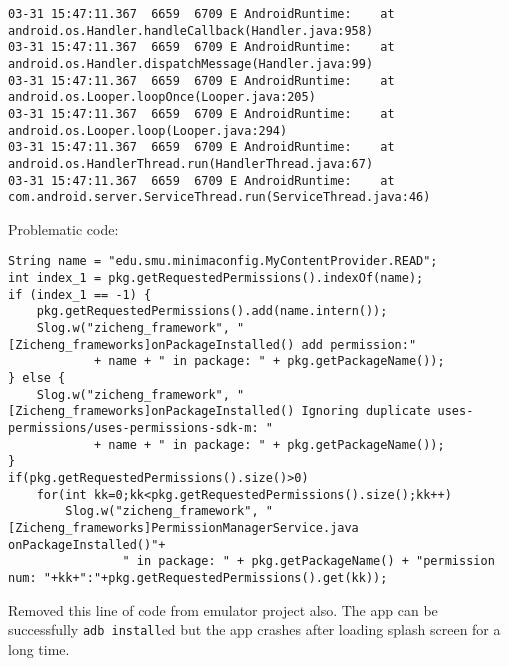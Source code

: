 \begin{lstlisting}
03-31 15:47:11.367  6659  6709 E AndroidRuntime: 	at android.os.Handler.handleCallback(Handler.java:958)
03-31 15:47:11.367  6659  6709 E AndroidRuntime: 	at android.os.Handler.dispatchMessage(Handler.java:99)
03-31 15:47:11.367  6659  6709 E AndroidRuntime: 	at android.os.Looper.loopOnce(Looper.java:205)
03-31 15:47:11.367  6659  6709 E AndroidRuntime: 	at android.os.Looper.loop(Looper.java:294)
03-31 15:47:11.367  6659  6709 E AndroidRuntime: 	at android.os.HandlerThread.run(HandlerThread.java:67)
03-31 15:47:11.367  6659  6709 E AndroidRuntime: 	at com.android.server.ServiceThread.run(ServiceThread.java:46)  
\end{lstlisting}

Problematic code:
\begin{lstlisting}      
String name = "edu.smu.minimaconfig.MyContentProvider.READ";
int index_1 = pkg.getRequestedPermissions().indexOf(name);
if (index_1 == -1) {
    pkg.getRequestedPermissions().add(name.intern());
    Slog.w("zicheng_framework", "[Zicheng_frameworks]onPackageInstalled() add permission:"
            + name + " in package: " + pkg.getPackageName());
} else {
    Slog.w("zicheng_framework", "[Zicheng_frameworks]onPackageInstalled() Ignoring duplicate uses-permissions/uses-permissions-sdk-m: "
            + name + " in package: " + pkg.getPackageName());
}
if(pkg.getRequestedPermissions().size()>0)
    for(int kk=0;kk<pkg.getRequestedPermissions().size();kk++)
        Slog.w("zicheng_framework", "[Zicheng_frameworks]PermissionManagerService.java onPackageInstalled()"+
                " in package: " + pkg.getPackageName() + "permission num: "+kk+":"+pkg.getRequestedPermissions().get(kk));
\end{lstlisting}
Removed this line of code from emulator project also. The app can be successfully \texttt{adb install}ed but the app crashes after loading splash screen for a long time.

% 



